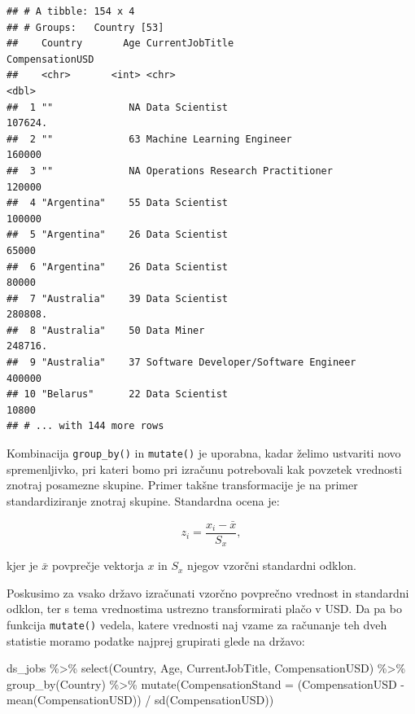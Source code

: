 \documentclass[
]{book}
\newenvironment{Shaded}{\begin{snugshade}}{\end{snugshade}}
\newcommand{\AttributeTok}[1]{\textcolor[rgb]{0.77,0.63,0.00}{#1}}
\newcommand{\FunctionTok}[1]{\textcolor[rgb]{0.00,0.00,0.00}{#1}}
\newcommand{\NormalTok}[1]{#1}
\newcommand{\SpecialCharTok}[1]{\textcolor[rgb]{0.00,0.00,0.00}{#1}}
\begin{document}
\begin{verbatim}
## # A tibble: 154 x 4
## # Groups:   Country [53]
##    Country       Age CurrentJobTitle                      CompensationUSD
##    <chr>       <int> <chr>                                          <dbl>
##  1 ""             NA Data Scientist                               107624.
##  2 ""             63 Machine Learning Engineer                    160000 
##  3 ""             NA Operations Research Practitioner             120000 
##  4 "Argentina"    55 Data Scientist                               100000 
##  5 "Argentina"    26 Data Scientist                                65000 
##  6 "Argentina"    26 Data Scientist                                80000 
##  7 "Australia"    39 Data Scientist                               280808.
##  8 "Australia"    50 Data Miner                                   248716.
##  9 "Australia"    37 Software Developer/Software Engineer         400000 
## 10 "Belarus"      22 Data Scientist                                10800 
## # ... with 144 more rows
\end{verbatim}

Kombinacija \texttt{group\_by()} in \texttt{mutate()} je uporabna, kadar želimo ustvariti novo spremenljivko, pri kateri bomo pri izračunu potrebovali kak povzetek vrednosti znotraj posamezne skupine. Primer takšne transformacije je na primer standardiziranje znotraj skupine. Standardna ocena je:

\[
z_i = \frac{x_i - \bar{x}}{S_x},
\]

kjer je \(\bar{x}\) povprečje vektorja \(x\) in \(S_x\) njegov vzorčni standardni odklon.

Poskusimo za vsako državo izračunati vzorčno povprečno vrednost in standardni odklon, ter s tema vrednostima ustrezno transformirati plačo v USD. Da pa bo funkcija \texttt{mutate()} vedela, katere vrednosti naj vzame za računanje teh dveh statistie moramo podatke najprej grupirati glede na državo:

\begin{Shaded}
\begin{Highlighting}[]
\NormalTok{ds\_jobs }\SpecialCharTok{\%\textgreater{}\%}
  \FunctionTok{select}\NormalTok{(Country, Age, CurrentJobTitle, CompensationUSD) }\SpecialCharTok{\%\textgreater{}\%}
  \FunctionTok{group\_by}\NormalTok{(Country) }\SpecialCharTok{\%\textgreater{}\%}
  \FunctionTok{mutate}\NormalTok{(}\AttributeTok{CompensationStand =}\NormalTok{ (CompensationUSD }\SpecialCharTok{{-}} \FunctionTok{mean}\NormalTok{(CompensationUSD)) }\SpecialCharTok{/} 
           \FunctionTok{sd}\NormalTok{(CompensationUSD))}
\end{Highlighting}
\end{Shaded}
\end{document}
